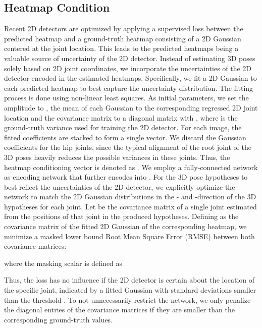 \documentclass[10pt,twocolumn,letterpaper]{article}
\begin{document}
\subsection{Heatmap Condition}\label{sec:heatmapCond}
Recent 2D detectors are optimized by applying a supervised loss between the predicted heatmap and a ground-truth heatmap consisting of a 2D Gaussian centered at the joint location.
This leads to the predicted heatmaps being a valuable source of uncertainty of the 2D detector.
Instead of estimating 3D poses solely based on 2D joint coordinates, we incorporate the uncertainties of the 2D detector encoded in the estimated heatmaps.
Specifically, we fit a 2D Gaussian to each predicted heatmap to best capture the uncertainty distribution.
The fitting process is done using non-linear least squares.
As initial parameters, we set the amplitude to , the mean of each Gaussian to the corresponding regressed 2D joint location and the covariance matrix to a diagonal matrix with , where  is the ground-truth variance used for training the 2D detector.
For each image, the fitted coefficients are stacked to form a single vector.
We discard the Gaussian coefficients for the hip joints, since the typical alignment of the root joint of the 3D poses heavily reduces the possible variances in these joints.
Thus, the heatmap conditioning vector is denoted as .
We employ a fully-connected network as encoding network  that further encodes  into .
For the 3D pose hypotheses to best reflect the uncertainties of the 2D detector, we explicitly optimize the network to match the 2D Gaussian distributions in the - and -direction of the 3D hypotheses for each joint.
Let  be the covariance matrix of a single joint estimated from the positions of that joint in the  produced hypotheses.
Defining  as the covariance matrix of the fitted 2D Gaussian of the corresponding heatmap, we minimize a masked lower bound Root Mean Square Error (RMSE) between both covariance matrices:   

where the masking scalar  is defined as

Thus, the loss has no influence if the 2D detector is certain about the location of the specific joint, indicated by a fitted Gaussian with standard deviations smaller than the threshold . 
To not unnecessarily restrict the network, we only penalize the diagonal entries of the covariance matrices if they are smaller than the corresponding ground-truth values.
\end{document}
